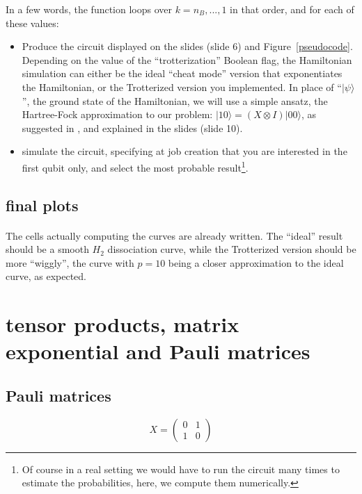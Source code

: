 \documentclass{article}
\begin{document}
In a few words, the function loops over $k=n_{B},...,1$ in that order, and for each of these values:
\begin{itemize}
\item Produce the circuit displayed on the slides (slide 6) and Figure~\ref{pseudocode}. 
Depending on the value of the ``trotterization'' Boolean
flag, the Hamiltonian simulation can either be the ideal ``cheat mode'' version that exponentiates the Hamiltonian,
or the Trotterized version you implemented. In place of ``$|\psi\rangle$'', the ground state of the Hamiltonian,
we will use a simple ansatz, the Hartree-Fock approximation to our problem: $|10\rangle=(X\otimes I)|00\rangle$, as suggested in
\textcolor{blue}{\cite{o2016scalable}}, and explained in the slides (slide 10).
\item simulate the circuit, specifying at job creation that you are interested in the first qubit only, and 
select the most probable result\footnote{Of course in a real setting we would have to run the circuit many times
to estimate the probabilities, here, we compute them numerically.}.
\end{itemize}

\subsection{final plots}

\paragraph{} The cells actually computing the curves are already written. 
The ``ideal'' result should be a smooth $H_{2}$ dissociation curve, 
while the Trotterized version should be more ``wiggly'',
the curve with $p=10$ being a closer approximation to the ideal curve, 
as expected.

\appendix
\section{tensor products, matrix exponential and Pauli matrices}

\subsection{Pauli matrices}

$$ X = \begin{pmatrix} 0 & 1 \\ 1 & 0 \end{pmatrix} $$
\end{document}
